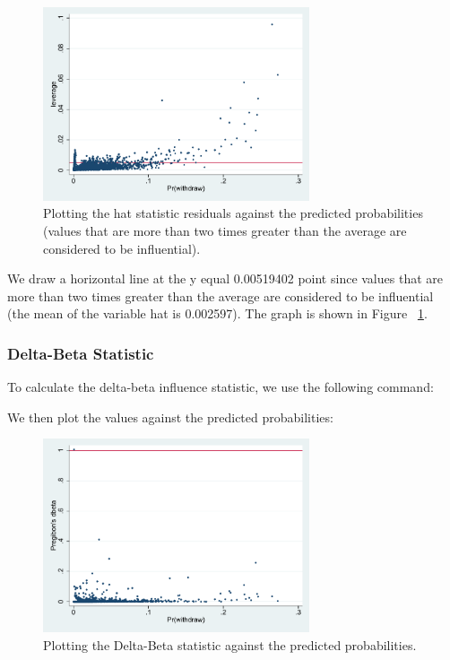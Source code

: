 \documentclass[a4paper,12pt,oneside]{book}
\begin{document}
\begin{stlog}\end{stlog}
\begin{figure}[h]
    \centering
    \includegraphics[width=0.7\textwidth]{book_50.pdf}
    \caption{Plotting the hat statistic residuals against the predicted probabilities (values that are more than two times greater than the average are considered to be influential).}
    \label{fig:influence1}
\end{figure}

We draw a horizontal line at the y equal 0.00519402 point since values that are more than two times greater than the average are considered to be influential (the mean of the variable hat is 0.002597). 
The graph is shown in Figure ~\ref{fig:influence1}. 
\subsubsection{Delta-Beta Statistic}
To calculate the delta-beta influence statistic, we use the following command:

\begin{stlog}\end{stlog}

We then plot the values against the predicted probabilities:

\begin{stlog}\end{stlog}
\begin{figure}[h]
    \centering
    \includegraphics[width=0.7\textwidth]{book_52.pdf}
    \caption{Plotting the Delta-Beta statistic against the predicted probabilities.}
    \label{fig:influence2}
\end{figure}
\end{document}
